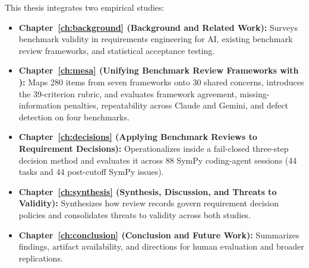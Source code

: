 This thesis integrates two empirical studies:
\begin{itemize}
    \item \textbf{Chapter~\ref{ch:background} (Background and Related Work):} Surveys benchmark validity in requirements engineering for AI, existing benchmark review frameworks, and statistical acceptance testing.
    \item \textbf{Chapter~\ref{ch:mesa} (Unifying Benchmark Review Frameworks with \mesa{}):} Maps 280 items from seven frameworks onto 30 shared concerns, introduces the 39-criterion \mesa{} rubric, and evaluates framework agreement, missing-information penalties, repeatability across Claude and Gemini, and defect detection on four benchmarks.
    \item \textbf{Chapter~\ref{ch:decisions} (Applying Benchmark Reviews to Requirement Decisions):} Operationalizes \mesa{} inside a fail-closed three-step decision method and evaluates it across 88 SymPy coding-agent sessions (44 \swebench{} tasks and 44 post-cutoff SymPy issues).
    \item \textbf{Chapter~\ref{ch:synthesis} (Synthesis, Discussion, and Threats to Validity):} Synthesizes how \mesa{} review records govern requirement decision policies and consolidates threats to validity across both studies.
    \item \textbf{Chapter~\ref{ch:conclusion} (Conclusion and Future Work):} Summarizes findings, artifact availability, and directions for human evaluation and broader replications.
\end{itemize}
